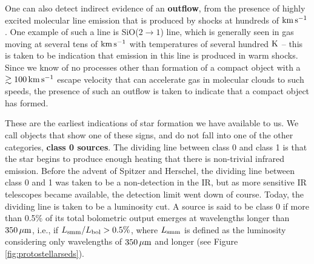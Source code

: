 \documentclass[a4paper,10pt]{article}
\begin{document}
{\noindent}One can also detect indirect evidence of an \textbf{outflow}, from the presence of highly excited molecular line emission that is produced by shocks at hundreds of ${\rm km\,s^{-1}}$. One example of such a line is SiO($2\rightarrow1$) line, which is generally seen in gas moving at several tens of ${\rm km\,s^{-1}}$ with temperatures of several hundred ${\rm K}$ -- this is taken to be indication that emission in this line is produced in warm shocks. Since we know of no processes other than formation of a compact object with a $\gtrsim100\,{\rm km\,s^{-1}}$ escape velocity that can accelerate gas in molecular clouds to such speeds, the presence of such an outflow is taken to indicate that a compact object has formed.

{\noindent}These are the earliest indications of star formation we have available to us. We call objects that show one of these signs, and do not fall into one of the other categories, \textbf{class 0 sources}. The dividing line between class 0 and class 1 is that the star begins to produce enough heating that there is non-trivial infrared emission. Before the advent of Spitzer and Herschel, the dividing line between class 0 and 1 was taken to be a non-detection in the IR, but as more sensitive IR telescopes became available, the detection limit went down of course. Today, the dividing line is taken to be a luminosity cut. A source is said to be class 0 if more than 0.5\% of its total bolometric output emerges at wavelengths longer than $350\,\mu{\rm m}$, i.e., if $L_{\rm smm}/L_{\rm bol}>0.5\%$, where $L_{\rm smm}$ is defined as the luminosity considering only wavelengths of $350\,\mu{\rm m}$ and longer (see Figure \ref{fig:protostellarseds}).
\end{document}
